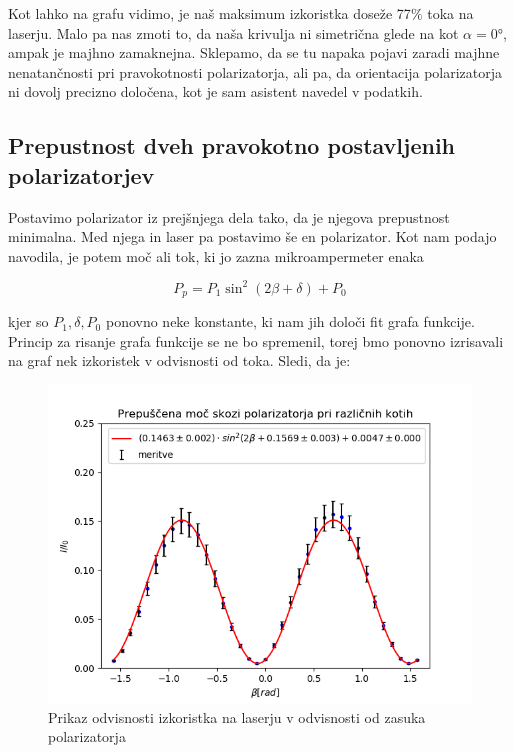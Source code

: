 \documentclass[11pt, a4paper]{article}
\theoremstyle{definition}
\theoremstyle{example}
\theoremstyle{izrek}
\begin{document}
Kot lahko na grafu vidimo, je naš maksimum izkoristka doseže 77$\%$ toka na laserju. Malo pa nas zmoti to, da naša krivulja ni simetrična glede na kot $\alpha=0°$, ampak je majhno zamaknejna. Sklepamo, da se tu napaka pojavi zaradi majhne nenatančnosti pri pravokotnosti polarizatorja, ali pa, da orientacija polarizatorja ni dovolj precizno določena, kot je sam asistent navedel v podatkih.

\subsection{Prepustnost dveh pravokotno postavljenih polarizatorjev}

Postavimo polarizator iz prejšnjega dela tako, da je njegova prepustnost minimalna. Med njega in laser pa postavimo še en polarizator. 
Kot nam podajo navodila, je potem moč ali tok, ki jo zazna mikroampermeter enaka

\begin{equation}
\label{Moč na detektorju, dva polarizatorja}
P_p=P_1 \sin^2(2\beta + \delta) + P_0 
\end{equation}

kjer so $P_1, \delta, P_0 $ ponovno neke konstante, ki nam jih določi fit grafa funkcije. 
Princip za risanje grafa funkcije se ne bo spremenil, torej bmo ponovno izrisavali na graf nek izkoristek v odvisnosti od toka. Sledi, da je: 

\begin{figure}[H]
	\centering
    \includegraphics[width=12cm]{Izkoristek_kot,2_polarizator.png}
    \caption{Prikaz odvisnosti izkoristka na laserju v odvisnosti od zasuka polarizatorja}
\end{figure}
\end{document}
